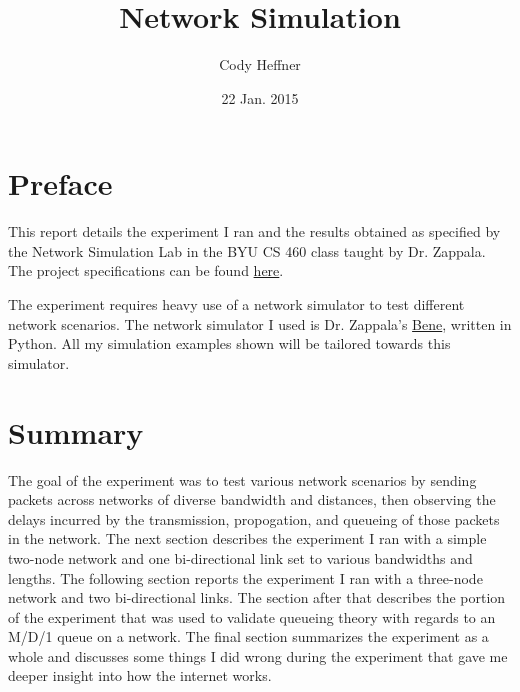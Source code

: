 \documentclass[11pt]{article}
\begin{document}
\lstset{
  language=Python,
  basicstyle=\small,          %
  keywordstyle=\bfseries,
  identifierstyle=,           %
  commentstyle=,              %
  stringstyle=\ttfamily,      %
  showstringspaces=false,     %
  numbers=left,
  numberstyle=\tiny,
  numbersep=5pt,
  frame=tb,
}

\newenvironment{absolutelynopagebreak}
  {\par\nobreak\vfil\penalty0\vfilneg
   \vtop\bgroup}
  {\par\xdef\tpd{\the\prevdepth}\egroup
   \prevdepth=\tpd}

\title{Network Simulation}

\author{Cody Heffner}

\date{22 Jan. 2015}

\maketitle

\section{Preface}

This report details the experiment I ran and the results obtained as specified by the Network Simulation Lab in the BYU CS 460 class taught by Dr. Zappala. The project specifications can be found \href{http://cs460.byu.edu/winter-2015/labs/network-simulation}{here}.

The experiment requires heavy use of a network simulator to test different network scenarios. The network simulator I used is Dr. Zappala's \href{https://github.com/zappala/bene}{Bene}, written in Python. All my simulation examples shown will be tailored towards this simulator.

\section{Summary}

The goal of the experiment was to test various network scenarios by sending packets across networks of diverse bandwidth and distances, then observing the delays incurred by the transmission, propogation, and queueing of those packets in the network. The next section describes the experiment I ran with a simple two-node network and one bi-directional link set to various bandwidths and lengths. The following section reports the experiment I ran with a three-node network and two bi-directional links. The section after that describes the portion of the experiment that was used to validate queueing theory with regards to an M/D/1 queue on a network. The final section summarizes the experiment as a whole and discusses some things I did wrong during the experiment that gave me deeper insight into how the internet works.
\end{document}
